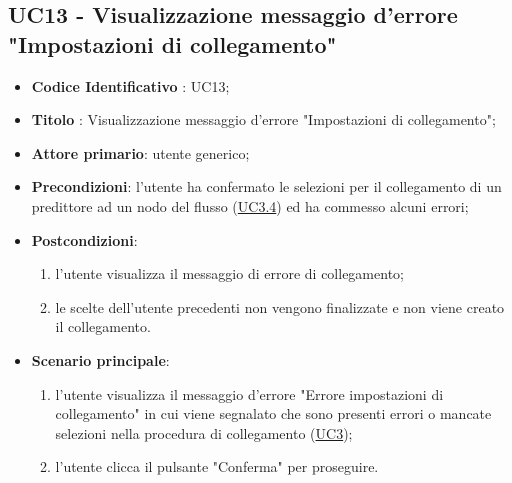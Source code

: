 	\subsection{UC13 - Visualizzazione messaggio d'errore "Impostazioni di collegamento"}
		\begin{itemize}
			\item\textbf{Codice Identificativo} : UC13;
			\item\textbf{Titolo} : Visualizzazione messaggio d'errore "Impostazioni di collegamento";
			\item\textbf{Attore primario}: utente generico;
			\item\textbf{Precondizioni}: l'utente ha confermato le selezioni per il collegamento di un predittore ad un nodo del flusso (\hyperref[par:UC3.4]{UC3.4}) ed ha commesso alcuni errori;
			\item\textbf{Postcondizioni}:
				\begin{enumerate}
					\item l'utente visualizza il messaggio di errore di collegamento;
					\item le scelte dell'utente precedenti non vengono finalizzate e non viene creato il collegamento.
				\end{enumerate}		
			\item\textbf{Scenario principale}:
				\begin{enumerate}
					\item l'utente visualizza il messaggio d'errore "Errore impostazioni di collegamento" in cui viene segnalato che sono presenti errori o mancate selezioni nella procedura di collegamento (\hyperref[par:UC3]{UC3});
					\item l'utente clicca il pulsante "Conferma" per proseguire.		
				\end{enumerate}		
		\end{itemize}

	
		\label{par:UC14}
